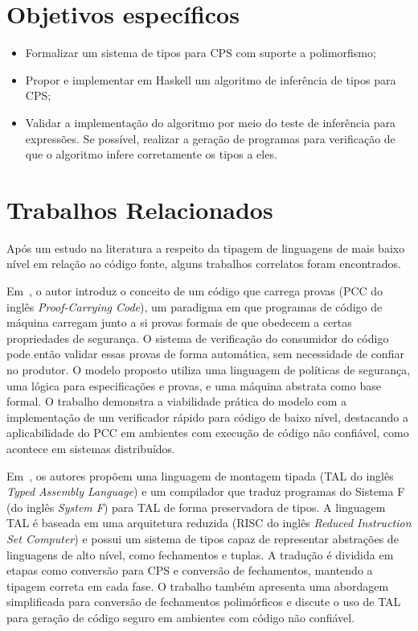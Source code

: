 \section{Objetivos específicos}\label{sec:objetivos-especificos}

\begin{itemize}
  \item Formalizar um sistema de tipos para CPS com suporte a polimorfismo;\@
  \item Propor e implementar em Haskell um algoritmo de inferência de tipos para CPS;\@
  \item Validar a implementação do algoritmo por meio do teste de inferência para expressões. Se possível, realizar a geração de programas para verificação de que o algoritmo infere corretamente os tipos a eles.
\end{itemize}

\section{Trabalhos Relacionados}
Após um estudo na literatura a respeito da tipagem de linguagens de mais baixo nível em relação ao código fonte, alguns trabalhos correlatos foram encontrados.

Em~\cite{necula1997pcc}, o autor introduz o conceito de um código que carrega provas (PCC do inglês \textit{Proof-Carrying Code}), um paradigma em que programas de código de máquina carregam junto a si provas formais de que obedecem a certas propriedades de segurança.
O sistema de verificação do consumidor do código pode então validar essas provas de forma automática, sem necessidade de confiar no produtor.
O modelo proposto utiliza uma linguagem de políticas de segurança, uma lógica para especificações e provas, e uma máquina abstrata como base formal.
O trabalho demonstra a viabilidade prática do modelo com a implementação de um verificador rápido para código de baixo nível, destacando a aplicabilidade do PCC em ambientes com execução de código não confiável, como acontece em sistemas distribuídos.

Em~\cite{morrisett1999systemF}, os autores propõem uma linguagem de montagem tipada (TAL do inglês \textit{Typed Assembly Language}) e um compilador que traduz programas do Sistema F (do inglês \textit{System F}) para TAL de forma preservadora de tipos.
A linguagem TAL é baseada em uma arquitetura reduzida (RISC do inglês \textit{Reduced Instruction Set Computer}) e possui um sistema de tipos capaz de representar abstrações de linguagens de alto nível, como fechamentos e tuplas.
A tradução é dividida em etapas como conversão para CPS e conversão de fechamentos, mantendo a tipagem correta em cada fase.
O trabalho também apresenta uma abordagem simplificada para conversão de fechamentos polimórficos e discute o uso de TAL para geração de código seguro em ambientes com código não confiável.

